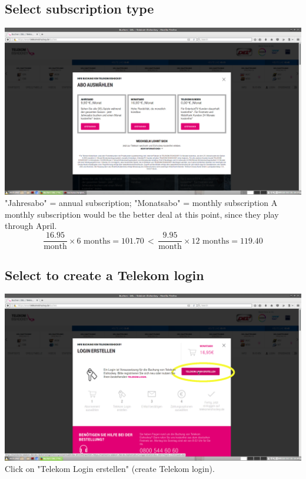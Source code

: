 \documentclass[12pt]{article}
\begin{document}
	\subsection{Select subscription type}
		\includegraphics[width=\textwidth]{02-options.png}
		"Jahresabo" = annual subscription; "Monatsabo" = monthly subscription
		A monthly subscription would be the better deal at this point, since they play through April.
		\[ \frac{16.95}{\mbox{month}} \times 6 \mbox{ months} = 101.70 \, <  \, \frac{9.95}{\mbox{month}} \times 12 \mbox{ months} = 119.40 \]
		
	\subsection{Select to create a Telekom login}
		\includegraphics[width=\textwidth]{03-create_login.png}
		Click on "Telekom Login erstellen" (create Telekom login).
	
\end{document}
